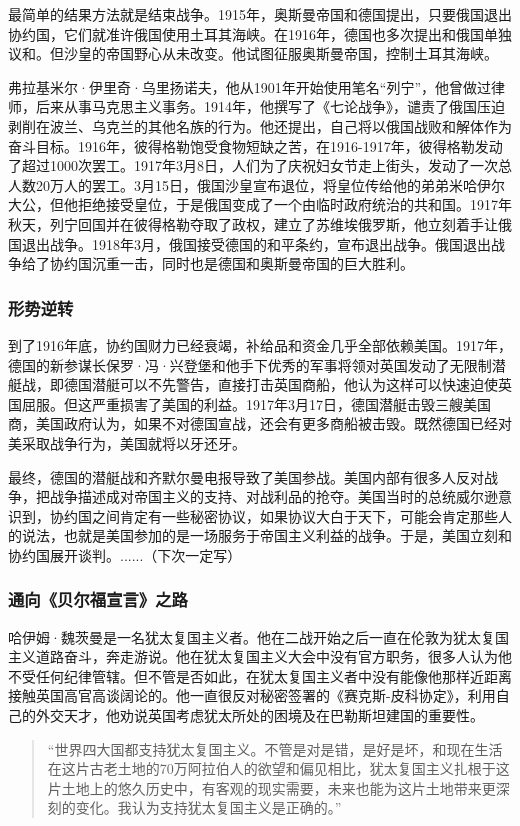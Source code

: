 \documentclass{article}
\begin{document}
最简单的结果方法就是结束战争。1915年，奥斯曼帝国和德国提出，只要俄国退出协约国，它们就准许俄国使用土耳其海峡。在1916年，德国也多次提出和俄国单独议和。但沙皇的帝国野心从未改变。他试图征服奥斯曼帝国，控制土耳其海峡。

弗拉基米尔·伊里奇·乌里扬诺夫，他从1901年开始使用笔名“列宁”，他曾做过律师，后来从事马克思主义事务。1914年，他撰写了《七论战争》，谴责了俄国压迫剥削在波兰、乌克兰的其他名族的行为。他还提出，自己将以俄国战败和解体作为奋斗目标。1916年，彼得格勒饱受食物短缺之苦，在1916-1917年，彼得格勒发动了超过1000次罢工。1917年3月8日，人们为了庆祝妇女节走上街头，发动了一次总人数20万人的罢工。3月15日，俄国沙皇宣布退位，将皇位传给他的弟弟米哈伊尔大公，但他拒绝接受皇位，于是俄国变成了一个由临时政府统治的共和国。1917年秋天，列宁回国并在彼得格勒夺取了政权，建立了苏维埃俄罗斯，他立刻着手让俄国退出战争。1918年3月，俄国接受德国的和平条约，宣布退出战争。俄国退出战争给了协约国沉重一击，同时也是德国和奥斯曼帝国的巨大胜利。
\subsubsection{形势逆转}
到了1916年底，协约国财力已经衰竭，补给品和资金几乎全部依赖美国。1917年，德国的新参谋长保罗·冯·兴登堡和他手下优秀的军事将领对英国发动了无限制潜艇战，即德国潜艇可以不先警告，直接打击英国商船，他认为这样可以快速迫使英国屈服。但这严重损害了美国的利益。1917年3月17日，德国潜艇击毁三艘美国商，美国政府认为，如果不对德国宣战，还会有更多商船被击毁。既然德国已经对美采取战争行为，美国就将以牙还牙。

最终，德国的潜艇战和齐默尔曼电报导致了美国参战。美国内部有很多人反对战争，把战争描述成对帝国主义的支持、对战利品的抢夺。美国当时的总统威尔逊意识到，协约国之间肯定有一些秘密协议，如果协议大白于天下，可能会肯定那些人的说法，也就是美国参加的是一场服务于帝国主义利益的战争。于是，美国立刻和协约国展开谈判。......（下次一定写）

\subsubsection{通向《贝尔福宣言》之路}
哈伊姆·魏茨曼是一名犹太复国主义者。他在二战开始之后一直在伦敦为犹太复国主义道路奋斗，奔走游说。他在犹太复国主义大会中没有官方职务，很多人认为他不受任何纪律管辖。但不管是否如此，在犹太复国主义者中没有能像他那样近距离接触英国高官高谈阔论的。他一直很反对秘密签署的《赛克斯-皮科协定》，利用自己的外交天才，他劝说英国考虑犹太所处的困境及在巴勒斯坦建国的重要性。
\begin{quote}
    “世界四大国都支持犹太复国主义。不管是对是错，是好是坏，和现在生活在这片古老土地的70万阿拉伯人的欲望和偏见相比，犹太复国主义扎根于这片土地上的悠久历史中，有客观的现实需要，未来也能为这片土地带来更深刻的变化。我认为支持犹太复国主义是正确的。”

\end{quote}
\end{document}
